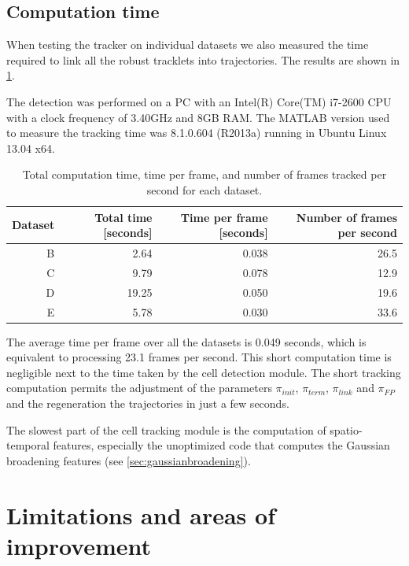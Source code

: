 	\subsection{Computation time \statusfirstdraft}
	
	When testing the tracker on individual datasets we also measured the time required to link all the robust tracklets into trajectories. The results are shown in \cref{tab:results_tracker_speed}. 
	
	The detection was performed on a PC with an Intel(R) Core(TM) i7-2600 CPU with a clock frequency of 3.40GHz and 8GB RAM. The MATLAB version used to measure the tracking time was 8.1.0.604 (R2013a) running in Ubuntu Linux 13.04 x64.
	
	\begin{table}[h]
		\centering
		\begin{tabular}{rrrr}
			Dataset & Total time [seconds] & Time per frame [seconds] & Number of frames per second \\
		\hline
			      B &                 2.64 &                   0.038 &                     26.5 \\
			      C &                 9.79 &                   0.078 &                     12.9 \\
			      D &                19.25 &                   0.050 &                     19.6 \\
			      E &                 5.78 &                   0.030 &                     33.6
		\end{tabular} 
		\caption{Total computation time, time per frame, and number of frames tracked per second for each dataset.}
		\label{tab:results_tracker_speed}
	\end{table}
	
	The average time per frame over all the datasets is 0.049 seconds, which is equivalent to processing 23.1 frames per second. This short computation time is negligible next to the time taken by the cell detection module. The short tracking computation permits the adjustment of the parameters $\pi_{init}$, $\pi_{term}$, $\pi_{link}$ and $\pi_{FP}$ and the regeneration the trajectories in just a few seconds.
	
	The slowest part of the cell tracking module is the computation of spatio-temporal features, especially the unoptimized code that computes the Gaussian broadening features (see \cref{sec:gaussianbroadening}).
	
\section{Limitations and areas of improvement \statusfirstdraft}
	\label{sec:results_limitations}
	
